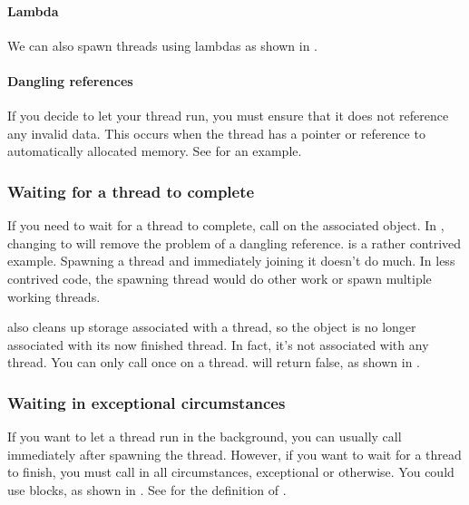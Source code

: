 
\paragraph{Lambda} 
We can also spawn threads using lambdas as shown in .


\paragraph{Dangling references}
If you decide to let your thread run, you must ensure that it does not reference any invalid data. This occurs when the thread has a pointer or reference to automatically allocated memory. See  for an example.


\subsubsection{Waiting for a thread to complete}
If you need to wait for a thread to complete, call  on the associated  object. In , changing  to  will remove the problem of a dangling reference.  is a rather contrived example. Spawning a thread and immediately joining it doesn't do much. In less contrived code, the spawning thread would do other work or spawn multiple working threads.

 also cleans up storage associated with a thread, so the  object is no longer associated with its now finished thread. In fact, it's not associated with any thread. You can only call  once on a thread.  will return false, as shown in .


\subsubsection{Waiting in exceptional circumstances}
If you want to let a thread run in the background, you can usually call  immediately after spawning the thread. However, if you want to wait for a thread to finish, you must call  in all circumstances, exceptional or otherwise. You could use  blocks, as shown in . See  for the definition of .

